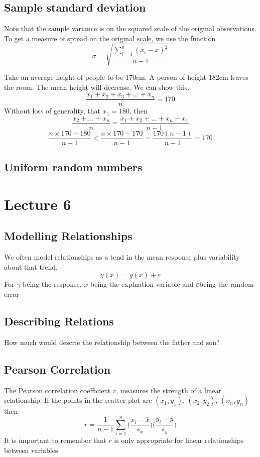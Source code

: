 \documentclass[a6paper]{article}
\theoremstyle{definition}
\theoremstyle{plain}
\theoremstyle{remark}
\begin{document}
\subsection{Sample standard deviation}
Note that the sample variance is on the squared scale of the original observations. To get a measure of spread on the original scale, we use the function
$$ \sigma = \sqrt{ \frac{\sum_{i=1}^n (x_i - \bar{x})^2}{n-1}} $$

Take an average height of people to be 170cm. A person of height 182cm leaves the room. The mean height will decrease. We can show this.
$$ \frac{x_1 + x_2 + x_3 + ... + x_n}{n} = 170 $$ Without loss of generality, that $ x_1 = 180 $, then $$ \frac{x_2 + ... + x_n}{n} = \frac{x_1 + x_2 + ... + x_n - x_1}{n-1}$$
$$ \frac{n \times 170 - 180}{n-1} < \frac{n \times 170 - 170}{n-1} = \frac{170(n-1)}{n-1} = 170 $$
\subsection{Uniform random numbers}

\section{Lecture 6}
\subsection{Modelling Relationships}
We often model relationships as a tend in the mean response plus variability about that trend.
$$ \gamma (x) = g(x) + \varepsilon $$
For $ \gamma $ being the response, $ x $ being the explnation variable and $ \varepsilon  $being the random error
\subsection{Describing Relations}
How much would descrie the relationship between the father and son?

\subsection{Pearson Correlation}
The Pearson correlation coefficient $ r $, measures the strength of a linear relationship. If the points in the scatter plot are $ (x_1, y_1) $, $ (x_2, y_2) $, $ (x_n, y_n) $ then
$$ r = \frac{1}{n-1} \sum_{i=1}^n \Big ( \frac{x_i - \bar{x}}{s_x}\Big) \Big ( \frac{y_i - \bar{y}}{s_y}\Big) $$
It  is important to remember that $ r $ is only appropriate for linear relationships between variables.
\end{document}
